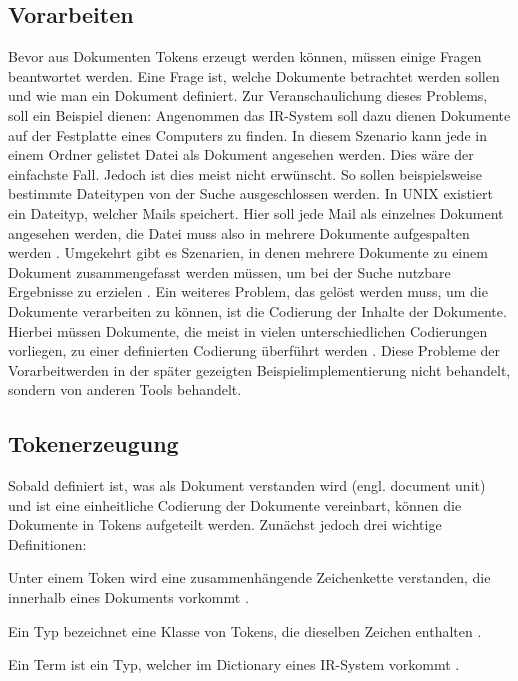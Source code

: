 \subsection{Vorarbeiten}
Bevor aus Dokumenten Tokens erzeugt werden können, müssen einige Fragen beantwortet werden.
Eine Frage ist, welche Dokumente betrachtet werden sollen und wie man ein Dokument definiert. Zur Veranschaulichung dieses Problems, soll ein Beispiel dienen:
\newline
Angenommen das IR-System soll dazu dienen Dokumente auf der Festplatte eines Computers zu finden. In diesem Szenario kann jede in einem Ordner gelistet Datei als Dokument angesehen werden. Dies wäre der einfachste Fall. Jedoch ist dies meist nicht erwünscht. So sollen beispielsweise bestimmte Dateitypen von der Suche ausgeschlossen werden. In UNIX existiert ein Dateityp, welcher Mails speichert. Hier soll jede Mail als einzelnes Dokument angesehen werden, die Datei muss also in mehrere Dokumente aufgespalten werden \cite{IR_Intro_Cambridge}.
Umgekehrt gibt es Szenarien, in denen mehrere Dokumente zu einem Dokument zusammengefasst werden müssen, um bei der Suche nutzbare Ergebnisse zu erzielen \cite{IR_Intro_Cambridge}.
\newline
Ein weiteres Problem, das gelöst werden muss, um die Dokumente verarbeiten zu können, ist die Codierung der Inhalte der Dokumente. Hierbei müssen Dokumente, die meist in vielen unterschiedlichen Codierungen vorliegen, zu einer definierten Codierung überführt werden \cite{IR_Intro_Cambridge}.
\newline
Diese Probleme der \glqq Vorarbeit\grqq werden in der später gezeigten Beispielimplementierung nicht behandelt, sondern von anderen Tools behandelt.

\subsection{Tokenerzeugung}
Sobald definiert ist, was als Dokument verstanden wird (engl. document unit) und ist eine einheitliche Codierung der Dokumente vereinbart, können die Dokumente in Tokens aufgeteilt werden.
\newline
Zunächst jedoch drei wichtige Definitionen:
\begin{defi}
	Unter einem Token wird eine zusammenhängende Zeichenkette verstanden, die innerhalb eines Dokuments vorkommt \cite{IR_Intro_Cambridge}.
\end{defi}
\begin{defi}
	Ein Typ bezeichnet eine Klasse von Tokens, die dieselben Zeichen enthalten \cite{IR_Intro_Cambridge}.
\end{defi}
\begin{defi}
	Ein Term ist ein Typ, welcher im Dictionary eines IR-System vorkommt \cite{IR_Intro_Cambridge}.
\end{defi}

